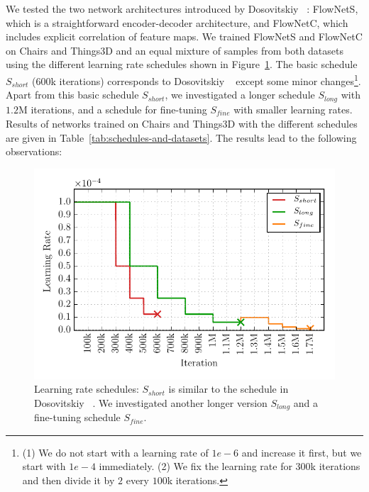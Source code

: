 \documentclass[10pt,twocolumn,letterpaper]{article}%
\newcommand{\chairs}{\mbox{Chairs}\xspace}
\newcommand{\things}{\mbox{Things3D}\xspace}
\newcommand{\Sshort}{S_\mathit{short}}
\newcommand{\Slong}{S_\mathit{long}}
\newcommand{\Sfine}{S_\mathit{fine}}
\begin{document}
We tested the two network architectures introduced by Dosovitskiy \etal~\cite{DFIB15}: FlowNetS, which is a straightforward encoder-decoder architecture, and FlowNetC, which includes explicit correlation of feature maps.
We trained FlowNetS and FlowNetC on \chairs and \things and an equal mixture of samples from both datasets using the different learning rate schedules shown in Figure~\ref{fig:lr-schedules}. The basic schedule $\Sshort$ ($600$k iterations) corresponds to Dosovitskiy \etal~\cite{DFIB15} except some minor changes\footnote{(1) We do not start with a learning rate of $1e-6$ and increase it first, but we start with $1e-4$ immediately. (2) We fix the learning rate for $300$k iterations and then divide it by $2$ every $100$k iterations.}. 
Apart from this basic schedule $\Sshort$, we investigated a longer schedule $\Slong$ with $1.2$M iterations, and a schedule for fine-tuning $\Sfine$ with smaller learning rates.
Results of networks trained on \chairs and \things with the different schedules are given in Table~\ref{tab:schedules-and-datasets}. The results lead to the following observations: 

\begin{figure}
  \begin{center}
      \includegraphics[width=\linewidth]{figures/lr-schedules-eps-converted-to.pdf}
  \end{center}
  \caption{Learning rate schedules: $\Sshort$ is similar to the schedule in Dosovitskiy \etal~\cite{DFIB15}. We investigated another longer version $\Slong$ and a fine-tuning schedule $\Sfine$.
  }
  \label{fig:lr-schedules}
\end{figure}%
\end{document}
